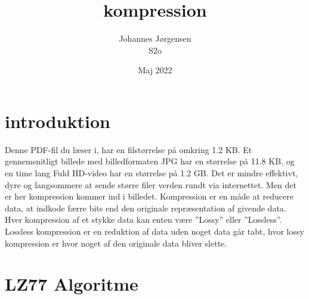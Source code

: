 \documentclass[12pt]{article}
\begin{document}
\title{kompression}
\author{Johannes Jørgensen\\ S2o}
\date{Maj 2022}
\maketitle
\pagebreak
\tableofcontents
\pagebreak

\section{introduktion}
Denne PDF-fil du læser i, har en filstørrelse på omkring 1.2 KB. 
Et gennemsnitligt billede med billedformaten JPG har en størrelse på 11.8 KB,\cite*{Solarwinds/filesizes} og en time lang Fuld HD-video har en størrelse på 1.2 GB.\cite*{filecatalyst/movesizes} 
Det er mindre effektivt, dyre og langsommere at sende større filer verden rundt via internettet. Men det er her kompression kommer ind i billedet. 
Kompression er en måde at reducere data, at indkode færre bits end den originale repræsentation af givende data. Hver kompression af et stykke data kan enten være ”Lossy” eller ”Lossless”.\cite*{Wiki/dataCompression} 
Lossless kompression er en reduktion af data uden noget data går tabt, hvor lossy kompression er hvor noget af den originale data bliver slette.
\section{LZ77 Algoritme}
\end{document}
